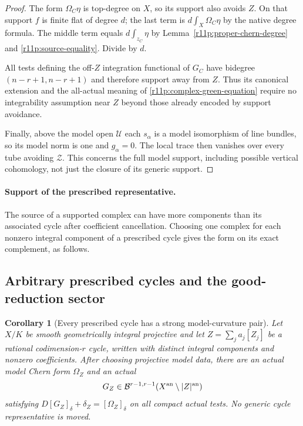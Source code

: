 \documentclass[11pt]{article}
\newtheorem{corollary}[theorem]{Corollary}
\theoremstyle{definition}
\theoremstyle{remark}
\numberwithin{equation}{section}
\begin{document}
\begin{proof}
The form $\Omega_C\eta$ is top-degree on $X$, so its support also
avoids $Z$.  On that support $f$ is finite flat of degree $d$;
the last term is $d\int_X\Omega_C\eta$ by the native degree formula.
The middle term equals $d\int_{z_C}\eta$ by
Lemma~\ref{r11p:proper-chern-degree} and
\eqref{r11p:source-equality}.  Divide by $d$.

All tests defining the off-$Z$ integration functional of $G_C$
have bidegree $(n-r+1,n-r+1)$ and therefore support away from $Z$.
Thus its canonical extension and the all-actual meaning of
\eqref{r11p:complex-green-equation} require no integrability
assumption near $Z$ beyond those already encoded by support avoidance.

Finally, above the model open $\mathcal U$ each $s_\alpha$ is a model
isomorphism of line bundles, so its model norm is one and $g_\alpha=0$.
The local trace then vanishes over every tube avoiding $\mathcal Z$.
This concerns the full model support, including possible vertical
cohomology, not just the closure of its generic support.
\end{proof}

\paragraph{Support of the prescribed representative.}
The source of a supported complex can have more components than its
associated cycle after coefficient cancellation.  Choosing one complex
for each nonzero integral component of a prescribed cycle gives the
form on its exact complement, as follows.

\subsection{Arbitrary prescribed cycles and the good-reduction sector}

\begin{corollary}[Every prescribed cycle has a strong model-curvature pair]
\label{r11p:any-cycle-pair}
Let $X/K$ be smooth geometrically integral projective and let
$Z=\sum_j a_j[Z_j]$ be a rational codimension-$r$ cycle, written with
distinct integral components and nonzero coefficients.  After choosing
projective model data, there are an actual model Chern form $\Omega_Z$
and an actual
\[
                  G_Z\in\mathcal B^{r-1,r-1}
                           (X^{\rm an}\setminus|Z|^{\rm an})
\]
satisfying $D[G_Z]_\delta+\delta_Z=[\Omega_Z]_\delta$ on all compact
actual tests.  No generic cycle representative is moved.
\end{corollary}
\end{document}
